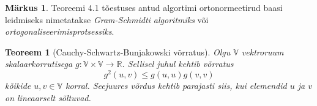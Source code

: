 \documentclass[a4paper,12pt]{article}
\theoremstyle{plain}
\newtheorem{teoreem}{Teoreem}[section]
\theoremstyle{definition}
\newtheorem{markus}{Märkus}[section]
\numberwithin{equation}{section}
\def\R{{\mathbb R}}
\begin{document}
\begin{markus} \label{markus:gram-schmidt}
Teoreemi 4.1 tõestuses antud algortimi ortonormeetirud baasi leidmiseks nimetatakse \emph{Gram-Schmidti algoritmiks} või \emph{ortogonaliseerimisprotsessiks}.
\end{markus}

\begin{teoreem}[Cauchy-Schwartz-Bunjakowski võrratus] \textnormal{\cite[teoreem II.1.1.]{FA2}} \label{teoreem:C-S-B}
Olgu $\mathbb{V}$ vektroruum skalaarkorrutisega $g : \mathbb{V} \times \mathbb{V} \rightarrow \R$. Sellisel juhul kehtib võrratus
\begin{equation} \label{eq:C-S-B}
g^2 \left(u, v \right) \leq g \left(u, u \right) g \left(v, v \right)
\end{equation}
kõikide $u, v \in \mathbb{V}$ korral. Seejuures võrdus kehtib parajasti siis, kui elemendid $u$ ja $v$ on lineaarselt sõltuvad.
\end{teoreem}
\end{document}
